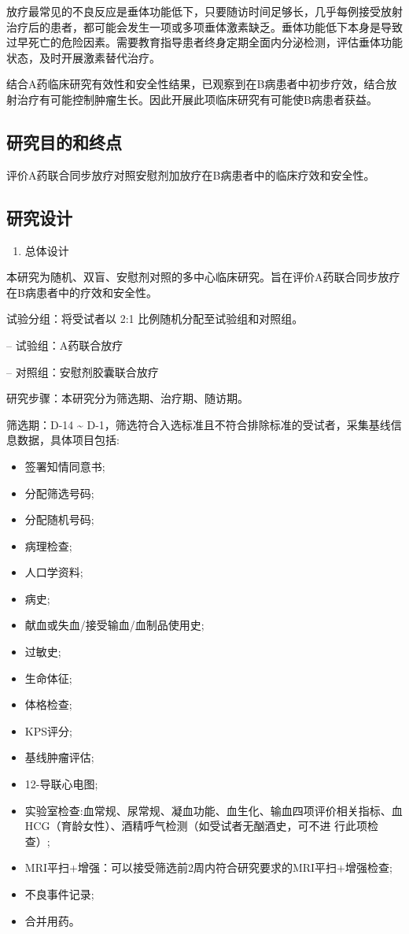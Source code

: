 \documentclass[
  chinese-hans,
  letterpaper,
  DIV=11,
  numbers=noendperiod]{scrreprt}
\providecommand{\tightlist}{%
  \setlength{\itemsep}{0pt}\setlength{\parskip}{0pt}}
\begin{document}
放疗最常见的不良反应是垂体功能低下，只要随访时间足够长，几乎每例接受放射治疗后的患者，都可能会发生一项或多项垂体激素缺乏。垂体功能低下本身是导致过早死亡的危险因素。需要教育指导患者终身定期全面内分泌检测，评估垂体功能状态，及时开展激素替代治疗。

结合A药临床研究有效性和安全性结果，已观察到在B病患者中初步疗效，结合放射治疗有可能控制肿瘤生长。因此开展此项临床研究有可能使B病患者获益。

\subsection{研究目的和终点}\label{ux7814ux7a76ux76eeux7684ux548cux7ec8ux70b9}

评价A药联合同步放疗对照安慰剂加放疗在B病患者中的临床疗效和安全性。

\subsection{研究设计}\label{ux7814ux7a76ux8bbeux8ba1}

\begin{enumerate}
\def\labelenumi{\arabic{enumi}.}
\tightlist
\item
  总体设计
\end{enumerate}

本研究为随机、双盲、安慰剂对照的多中心临床研究。旨在评价A药联合同步放疗在B病患者中的疗效和安全性。

试验分组：将受试者以 2:1 比例随机分配至试验组和对照组。

-- 试验组：A药联合放疗

-- 对照组：安慰剂胶囊联合放疗

研究步骤：本研究分为筛选期、治疗期、随访期。

筛选期：D-14 \textasciitilde{}
D-1，筛选符合入选标准且不符合排除标准的受试者，采集基线信息数据，具体项目包括:

\begin{itemize}
\item
  签署知情同意书;
\item
  分配筛选号码;
\item
  分配随机号码;
\item
  病理检查;
\item
  人口学资料;
\item
  病史;
\item
  献血或失血/接受输血/血制品使用史;
\item
  过敏史;
\item
  生命体征;
\item
  体格检查;
\item
  KPS评分;
\item
  基线肿瘤评估;
\item
  12-导联心电图;
\item
  实验室检查:血常规、尿常规、凝血功能、血生化、输血四项评价相关指标、血HCG（育龄女性）、酒精呼气检测（如受试者无酗酒史，可不进
  行此项检查）;
\item
  MRI平扫+增强：可以接受筛选前2周内符合研究要求的MRI平扫+增强检查;
\item
  不良事件记录;
\item
  合并用药。
\end{itemize}
\end{document}
